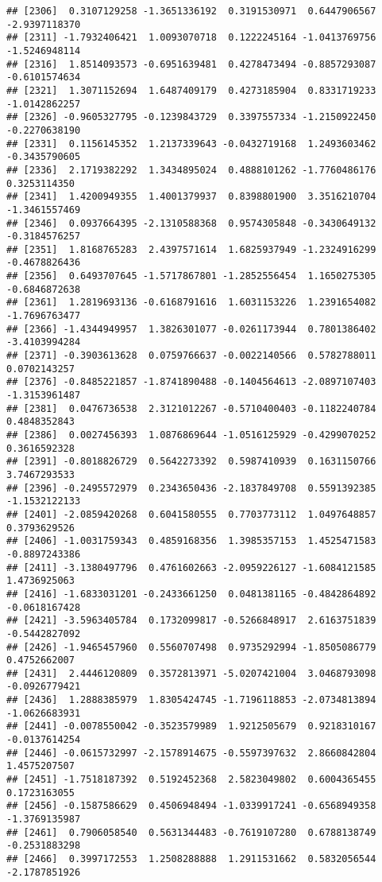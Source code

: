 \documentclass[
]{article}
\begin{document}
\begin{verbatim}
## [2306]  0.3107129258 -1.3651336192  0.3191530971  0.6447906567 -2.9397118370
## [2311] -1.7932406421  1.0093070718  0.1222245164 -1.0413769756 -1.5246948114
## [2316]  1.8514093573 -0.6951639481  0.4278473494 -0.8857293087 -0.6101574634
## [2321]  1.3071152694  1.6487409179  0.4273185904  0.8331719233 -1.0142862257
## [2326] -0.9605327795 -0.1239843729  0.3397557334 -1.2150922450 -0.2270638190
## [2331]  0.1156145352  1.2137339643 -0.0432719168  1.2493603462 -0.3435790605
## [2336]  2.1719382292  1.3434895024  0.4888101262 -1.7760486176  0.3253114350
## [2341]  1.4200949355  1.4001379937  0.8398801900  3.3516210704 -1.3461557469
## [2346]  0.0937664395 -2.1310588368  0.9574305848 -0.3430649132 -0.3184576257
## [2351]  1.8168765283  2.4397571614  1.6825937949 -1.2324916299 -0.4678826436
## [2356]  0.6493707645 -1.5717867801 -1.2852556454  1.1650275305 -0.6846872638
## [2361]  1.2819693136 -0.6168791616  1.6031153226  1.2391654082 -1.7696763477
## [2366] -1.4344949957  1.3826301077 -0.0261173944  0.7801386402 -3.4103994284
## [2371] -0.3903613628  0.0759766637 -0.0022140566  0.5782788011  0.0702143257
## [2376] -0.8485221857 -1.8741890488 -0.1404564613 -2.0897107403 -1.3153961487
## [2381]  0.0476736538  2.3121012267 -0.5710400403 -0.1182240784  0.4848352843
## [2386]  0.0027456393  1.0876869644 -1.0516125929 -0.4299070252  0.3616592328
## [2391] -0.8018826729  0.5642273392  0.5987410939  0.1631150766  3.7467293533
## [2396] -0.2495572979  0.2343650436 -2.1837849708  0.5591392385 -1.1532122133
## [2401] -2.0859420268  0.6041580555  0.7703773112  1.0497648857  0.3793629526
## [2406] -1.0031759343  0.4859168356  1.3985357153  1.4525471583 -0.8897243386
## [2411] -3.1380497796  0.4761602663 -2.0959226127 -1.6084121585  1.4736925063
## [2416] -1.6833031201 -0.2433661250  0.0481381165 -0.4842864892 -0.0618167428
## [2421] -3.5963405784  0.1732099817 -0.5266848917  2.6163751839 -0.5442827092
## [2426] -1.9465457960  0.5560707498  0.9735292994 -1.8505086779  0.4752662007
## [2431]  2.4446120809  0.3572813971 -5.0207421004  3.0468793098 -0.0926779421
## [2436]  1.2888385979  1.8305424745 -1.7196118853 -2.0734813894 -1.0626683931
## [2441] -0.0078550042 -0.3523579989  1.9212505679  0.9218310167 -0.0137614254
## [2446] -0.0615732997 -2.1578914675 -0.5597397632  2.8660842804  1.4575207507
## [2451] -1.7518187392  0.5192452368  2.5823049802  0.6004365455  0.1723163055
## [2456] -0.1587586629  0.4506948494 -1.0339917241 -0.6568949358 -1.3769135987
## [2461]  0.7906058540  0.5631344483 -0.7619107280  0.6788138749 -0.2531883298
## [2466]  0.3997172553  1.2508288888  1.2911531662  0.5832056544 -2.1787851926

\end{verbatim}
\end{document}
